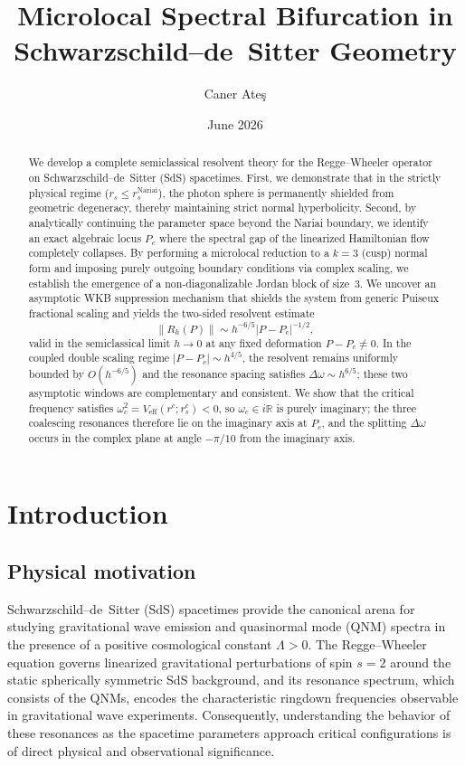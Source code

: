\documentclass[12pt,a4paper]{amsart}
\title{Microlocal Spectral Bifurcation in Schwarzschild--de~Sitter Geometry}
\author{Caner Ate\c{s}}
\date{June 2026}
\theoremstyle{remark}
\begin{document}
\begin{abstract}
We develop a complete semiclassical resolvent theory for the Regge--Wheeler
operator on Schwarzschild--de~Sitter (SdS) spacetimes. First, we demonstrate that in
the strictly physical regime ($r_s \leq r_s^{\mathrm{Nariai}}$), the photon sphere
is permanently shielded from geometric degeneracy, thereby maintaining strict normal
hyperbolicity. Second, by analytically continuing the parameter space beyond the
Nariai boundary, we identify an exact algebraic locus $P_c$ where the spectral gap
of the linearized Hamiltonian flow completely collapses. By performing a microlocal
reduction to a $k=3$ (cusp) normal form and imposing purely outgoing boundary
conditions via complex scaling, we establish the emergence of a non-diagonalizable
Jordan block of size~3. We uncover an asymptotic WKB suppression mechanism that
shields the system from generic Puiseux fractional scaling and yields the two-sided
resolvent estimate
\[
  \|R_h(P)\| \sim h^{-6/5}|P - P_c|^{-1/2},
\]
valid in the semiclassical limit $h\to 0$ at any fixed deformation $P - P_c \neq 0$.
In the coupled double scaling regime $|P - P_c| \sim h^{4/5}$, the resolvent remains
uniformly bounded by $O(h^{-6/5})$ and the resonance spacing satisfies
$\Delta\omega \sim h^{6/5}$; these two asymptotic windows are complementary and
consistent. We show that the critical frequency satisfies
$\omega_c^2 = V_{\mathrm{eff}}(r^c;r_s^c) < 0$, so $\omega_c \in i\mathbb{R}$ is
purely imaginary; the three coalescing resonances therefore lie on the imaginary axis
at $P_c$, and the splitting $\Delta\omega$ occurs in the complex plane at angle
$-\pi/10$ from the imaginary axis.
\end{abstract}

\maketitle

\section{Introduction}

\subsection*{Physical motivation}

Schwarzschild--de~Sitter (SdS) spacetimes provide the canonical arena for studying
gravitational wave emission and quasinormal mode (QNM) spectra in the presence of a
positive cosmological constant $\Lambda > 0$. The Regge--Wheeler equation governs
linearized gravitational perturbations of spin $s=2$ around the static spherically
symmetric SdS background, and its resonance spectrum, which consists of the QNMs, encodes
the characteristic ringdown frequencies observable in gravitational wave experiments.
Consequently, understanding the behavior of these resonances as the spacetime parameters
approach critical configurations is of direct physical and observational significance.
\end{document}
